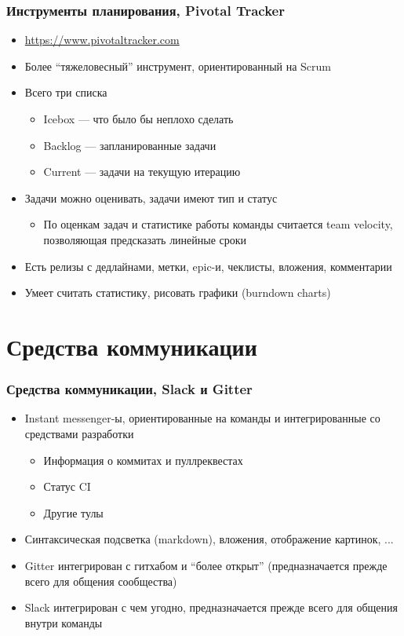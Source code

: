 \documentclass[xetex,mathserif,serif]{beamer}
\begin{document}
	\begin{frame}
		\frametitle{Инструменты планирования, Pivotal Tracker}
		\begin{itemize}
			\item \url{https://www.pivotaltracker.com}
			\item Более ``тяжеловесный'' инструмент, ориентированный на Scrum
			\item Всего три списка
			\begin{itemize}
				\item Icebox --- что было бы неплохо сделать
				\item Backlog --- запланированные задачи
				\item Current --- задачи на текущую итерацию
			\end{itemize}
			\item Задачи можно оценивать, задачи имеют тип и статус
			\begin{itemize}
				\item По оценкам задач и статистике работы команды считается team velocity, позволяющая предсказать линейные сроки
			\end{itemize}
			\item Есть релизы с дедлайнами, метки, epic-и, чеклисты, вложения, комментарии
			\item Умеет считать статистику, рисовать графики (burndown charts)
		\end{itemize}
	\end{frame}

	\section{Средства коммуникации}

	\begin{frame}
		\frametitle{Средства коммуникации, Slack и Gitter}
		\begin{itemize}
			\item Instant messenger-ы, ориентированные на команды и интегрированные со средствами разработки
			\begin{itemize}
				\item Информация о коммитах и пуллреквестах
				\item Статус CI
				\item Другие тулы
			\end{itemize}
			\item Синтаксическая подсветка (markdown), вложения, отображение картинок, ...
			\item Gitter интегрирован с гитхабом и ``более открыт'' (предназначается прежде всего для общения сообщества)
			\item Slack интегрирован с чем угодно, предназначается прежде всего для общения внутри команды
		\end{itemize}
	\end{frame}
\end{document}
